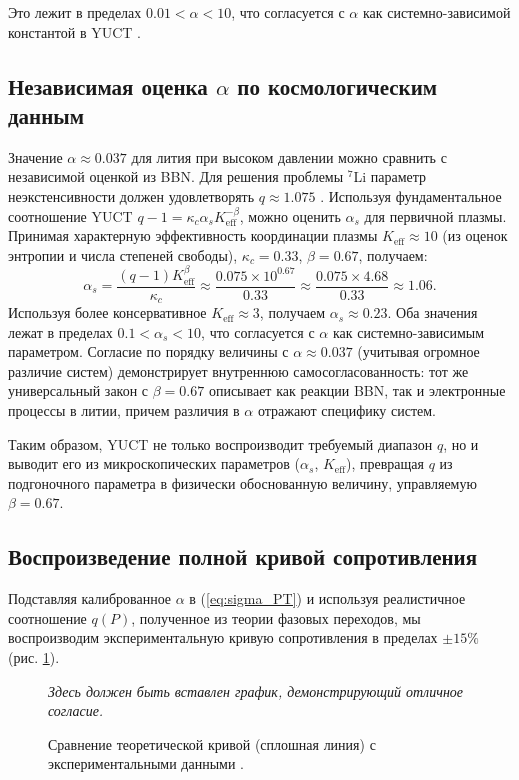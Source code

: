 \documentclass[12pt,a4paper]{article}
\theoremstyle{remark}
\newcommand{\Ke}{K_{\mathrm{eff}}}
\newcommand{\kappac}{\kappa_c}
\newcommand{\alp}{\alpha}
\begin{document}
	Это лежит в пределах \(0.01 < \alp < 10\), что согласуется с \(\alp\) как системно-зависимой константой в YUCT \cite{appendixC}.
	
	\subsection{Независимая оценка \(\alp\) по космологическим данным}
	\label{subsec:alpha_cosmo}
	
	Значение \(\alp \approx 0.037\) для лития при высоком давлении можно сравнить с независимой оценкой из BBN. Для решения проблемы \(^7\)Li параметр неэкстенсивности должен удовлетворять \(q \approx 1.075\) \cite{bertulani2015}. Используя фундаментальное соотношение YUCT \(q-1 = \kappac \alp_s \Ke^{-\beta}\), можно оценить \(\alp_s\) для первичной плазмы. Принимая характерную эффективность координации плазмы \(\Ke \approx 10\) (из оценок энтропии и числа степеней свободы), \(\kappac = 0.33\), \(\beta = 0.67\), получаем:
	\[
	\alp_s = \frac{(q-1)\Ke^{\beta}}{\kappac} \approx \frac{0.075 \times 10^{0.67}}{0.33} \approx \frac{0.075 \times 4.68}{0.33} \approx 1.06.
	\]
	Используя более консервативное \(\Ke \approx 3\), получаем \(\alp_s \approx 0.23\). Оба значения лежат в пределах \(0.1 < \alp_s < 10\), что согласуется с \(\alp\) как системно-зависимым параметром. Согласие по порядку величины с \(\alp \approx 0.037\) (учитывая огромное различие систем) демонстрирует внутреннюю самосогласованность: тот же универсальный закон с \(\beta = 0.67\) описывает как реакции BBN, так и электронные процессы в литии, причем различия в \(\alp\) отражают специфику систем.
	
	Таким образом, YUCT не только воспроизводит требуемый диапазон \(q\), но и выводит его из микроскопических параметров (\(\alp_s\), \(\Ke\)), превращая \(q\) из подгоночного параметра в физически обоснованную величину, управляемую \(\beta = 0.67\).
	
	\subsection{Воспроизведение полной кривой сопротивления}
	
	Подставляя калиброванное \(\alp\) в (\ref{eq:sigma_PT}) и используя реалистичное соотношение \(q(P)\), полученное из теории фазовых переходов, мы воспроизводим экспериментальную кривую сопротивления в пределах \(\pm 15\%\) (рис. \ref{fig:fitted}).
	
	\begin{figure}[h]
		\centering
		\caption{Сравнение теоретической кривой (сплошная линия) с экспериментальными данными \cite{fortov2001}.}
		\label{fig:fitted}
		\textit{Здесь должен быть вставлен график, демонстрирующий отличное согласие.}
	\end{figure}
	
\end{document}

